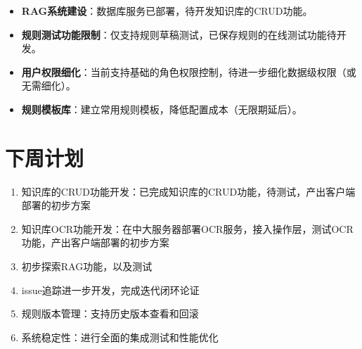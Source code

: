 \documentclass[UTF8]{ctexart}
\begin{document}
\begin{itemize}
    \item \textbf{RAG系统建设}：数据库服务已部署，待开发知识库的CRUD功能。
\item \textbf{规则测试功能限制}：仅支持规则草稿测试，已保存规则的在线测试功能待开发。
\item \textbf{用户权限细化}：当前支持基础的角色权限控制，待进一步细化数据级权限（或无需细化）。
\item \textbf{规则模板库}：建立常用规则模板，降低配置成本（无限期延后）。
\end{itemize}

\section{下周计划}

\begin{enumerate}
\item 知识库的CRUD功能开发：已完成知识库的CRUD功能，待测试，产出客户端部署的初步方案
\item 知识库OCR功能开发：在中大服务器部署OCR服务，接入操作层，测试OCR功能，产出客户端部署的初步方案
\item 初步探索RAG功能，以及测试
\item issue追踪进一步开发，完成迭代闭环论证
\item 规则版本管理：支持历史版本查看和回滚
\item 系统稳定性：进行全面的集成测试和性能优化
\end{enumerate}
\end{document}
